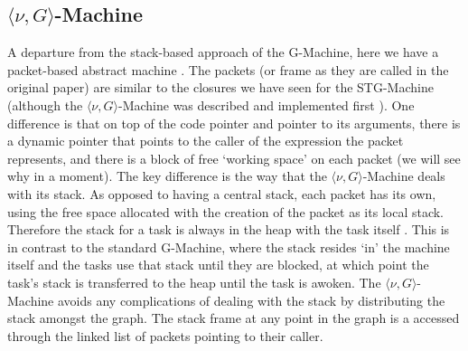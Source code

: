  \subsection{$\langle \nu , G\rangle $-Machine}
    A departure from the stack-based approach of the G-Machine, here we have a
packet-based abstract machine \citep{vGMachine, Alice}.
    The packets (or frame as they are called in the
original paper) are similar to the closures we have seen for the STG-Machine
(although the $\langle \nu , G\rangle $-Machine was described and implemented
first \citep{vGMachine}). One difference is that on top of the code pointer and
pointer to its arguments, there is a dynamic pointer that points to the caller of
the expression the packet represents, and there is a block of free `working
space' on each packet (we will see why in a moment).
The key difference is the way that the
$\langle \nu , G\rangle $-Machine deals with its stack.
As opposed to having a central stack, each packet has its own, using the free
space allocated with the creation of the packet as its local stack.
Therefore the stack for a task is always in
the heap with the task itself \citep{vGMachine}. This is in contrast to the standard
G-Machine, where the stack resides `in' the machine itself and the tasks use
that stack until they are blocked, at which point the task's stack is
transferred to the heap until the task is awoken.
    The $\langle \nu , G\rangle $-Machine avoids any complications of dealing
with the stack by distributing the stack amongst the graph. The stack frame at
any point in the graph is a accessed through the linked list of packets pointing
to their caller.
